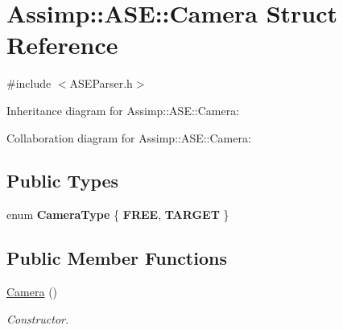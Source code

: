 \hypertarget{struct_assimp_1_1_a_s_e_1_1_camera}{\section{Assimp\+:\+:A\+S\+E\+:\+:Camera Struct Reference}
\label{struct_assimp_1_1_a_s_e_1_1_camera}
}


{\ttfamily \#include $<$A\+S\+E\+Parser.\+h$>$}



Inheritance diagram for Assimp\+:\+:A\+S\+E\+:\+:Camera\+:


Collaboration diagram for Assimp\+:\+:A\+S\+E\+:\+:Camera\+:
\subsection*{Public Types}
\begin{DoxyCompactItemize}
\item 
\hypertarget{struct_assimp_1_1_a_s_e_1_1_camera_af01d4a3ef28c0def77a86deb1dcd42b4}{enum {\bfseries Camera\+Type} \{ {\bfseries F\+R\+E\+E}, 
{\bfseries T\+A\+R\+G\+E\+T}
 \}}\label{struct_assimp_1_1_a_s_e_1_1_camera_af01d4a3ef28c0def77a86deb1dcd42b4}

\end{DoxyCompactItemize}
\subsection*{Public Member Functions}
\begin{DoxyCompactItemize}
\item 
\hypertarget{struct_assimp_1_1_a_s_e_1_1_camera_ac67d0865532592d5e9581052850cc935}{\hyperlink{struct_assimp_1_1_a_s_e_1_1_camera_ac67d0865532592d5e9581052850cc935}{Camera} ()}\label{struct_assimp_1_1_a_s_e_1_1_camera_ac67d0865532592d5e9581052850cc935}

\begin{DoxyCompactList}\small\item\em Constructor. \end{DoxyCompactList}\end{DoxyCompactItemize}
